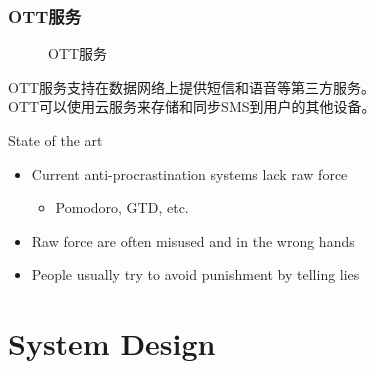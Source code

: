 \documentclass[UTF8,10pt,aspectratio=43]{ctexbeamer}
\begin{document}
 \begin{frame}
\frametitle{OTT服务}
\begin{figure}[!t]
	\centering
	\caption{OTT服务}
	\label{figure3_OTT}
\end{figure}
\begin{center}
	OTT服务支持在数据网络上提供短信和语音等第三方服务。\\
	OTT可以使用云服务来存储和同步SMS到用户的其他设备。
\end{center}

\end{frame}

\begin{frame}{State of the art}
\begin{itemize}
\item Current anti-procrastination systems lack raw force
\begin{itemize}
\item Pomodoro, GTD, etc.
\end{itemize}
\item Raw force are often misused and in the wrong hands
\item People usually try to avoid punishment by telling lies
\end{itemize}
\end{frame}
\section{System Design}  %
\end{document}
